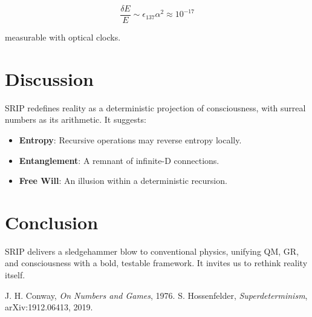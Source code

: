 \documentclass[12pt]{article}
\begin{document}
\[
\frac{\delta E}{E} \sim \epsilon_{137} \alpha^2 \approx 10^{-17}
\]

measurable with optical clocks.

\section{Discussion}
SRIP redefines reality as a deterministic projection of consciousness, with surreal numbers as its arithmetic. It suggests:
\begin{itemize}
    \item \textbf{Entropy}: Recursive operations may reverse entropy locally.
    \item \textbf{Entanglement}: A remnant of infinite-D connections.
    \item \textbf{Free Will}: An illusion within a deterministic recursion.
\end{itemize}

\section{Conclusion}
SRIP delivers a sledgehammer blow to conventional physics, unifying QM, GR, and consciousness with a bold, testable framework. It invites us to rethink reality itself.

\begin{thebibliography}{9}
 J. H. Conway, \textit{On Numbers and Games}, 1976.
 S. Hossenfelder, \textit{Superdeterminism}, arXiv:1912.06413, 2019.
\end{thebibliography}
\end{document}
